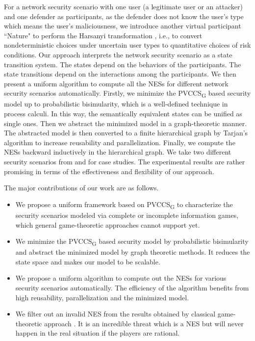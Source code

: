 \documentclass[10pt, conference, compsocconf]{IEEEtran}
\begin{document}
For a network security scenario with one user (a legitimate user or an attacker) and one defender as participants, as the defender does not know the user's type which means the user's maliciousness, we introduce another virtual participant ``Nature" to perform the Harsanyi transformation \cite{rd}, i.e., to convert nondeterministic choices under uncertain user types to quantitative choices of risk conditions.
Our approach interprets the network security scenario as a state transition system.
The states depend on the behaviors of the participants.
The state transitions depend on the interactions among the participants.
We then present a uniform algorithm to compute all the NESs for different network security scenarios automatically.
Firstly, we minimize the PVCCS\textsubscript{G} based security model up to probabilistic bisimularity, which is a well-defined technique in process calculi. In this way, the semantically equivalent states can be unified as single ones.
Then we abstract the minimized model in a graph-theoretic manner.
The abstracted model is then converted to a finite hierarchical graph by Tarjan's algorithm \cite{reinhard} to increase reusability and parallelization.
Finally, we compute the NESs backward inductively in the hierarchical graph.
We take two different security scenarios from \cite{harkeerat} and \cite{klye} for case studies. The experimental results are rather promising in terms of the effectiveness and flexibility of our approach.


The major contributions of our work are as follows.
\begin{itemize}
\item
We propose a uniform framework based on PVCCS\textsubscript{G} to characterize the security scenarios modeled via complete or incomplete information games, which general game-theoretic approaches cannot support yet.
\item
We minimize the PVCCS\textsubscript{G} based security model by probabilistic bisimularity and abstract the minimized model by graph theoretic methods. It reduces the state space and makes our model to be scalable.
\item
We propose a uniform algorithm to compute out the NESs for various security scenarios automatically.
The efficiency of the algorithm benefits from high reusability, parallelization and the minimized model.
\item
We filter out an invalid NES from the results obtained by classical game-theoretic approach \cite{klye}. It is an incredible threat \cite{martin} which is a NES but will never happen in the real situation if the players are rational.
\end{itemize}
\end{document}
